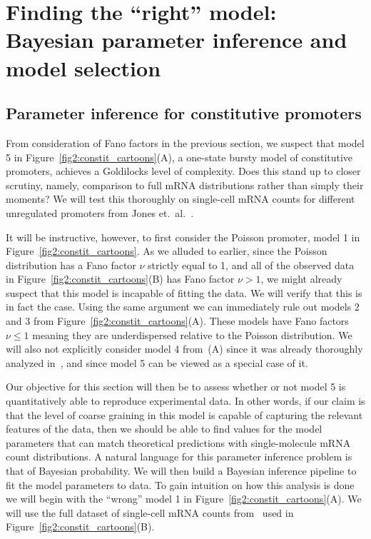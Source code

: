 \section{Finding the ``right'' model: Bayesian parameter inference and model 
selection}
\label{section_04_bayesian_inference}
\subsection{Parameter inference for constitutive promoters}

From consideration of Fano factors in the previous section, we suspect that
model 5 in Figure~\ref{fig2:constit_cartoons}(A), a one-state bursty model of
constitutive promoters, achieves a Goldilocks level of complexity. Does this
stand up to closer scrutiny, namely, comparison to full mRNA distributions
rather than simply their moments? We will test this thoroughly on
single-cell mRNA counts for different unregulated promoters from Jones et.\
al.~\cite{Jones2014}.

It will be instructive, however, to first consider the Poisson promoter, model 1
in Figure~\ref{fig2:constit_cartoons}. As we alluded to earlier, since the
Poisson distribution has a Fano factor $\nu$ strictly equal to 1, and all of
the observed data in Figure~\ref{fig2:constit_cartoons}(B) has Fano factor
$\nu>1$, we might already suspect that this model is incapable of fitting the
data. We will verify that this is in fact the case. Using the same argument we
can immediately rule out models 2 and 3 from
Figure~\ref{fig2:constit_cartoons}(A). These models have Fano factors $\nu\le 1$
meaning they are underdispersed relative to the Poisson distribution. We will
also not explicitly consider model 4 from~\fig{fig2:constit_cartoons}(A) since
it was already thoroughly analyzed in~\cite{Razo-Mejia2020}, and since model 5
can be viewed as a special case of it.

Our objective for this section will then be to assess whether or not model 5 is
quantitatively able to reproduce experimental data. In other words, if our claim
is that the level of coarse graining in this model is capable of capturing the
relevant features of the data, then we should be able to find values for the
model parameters that can match theoretical predictions with single-molecule
mRNA count distributions. A natural language for this parameter inference
problem is that of Bayesian probability. We will then build a Bayesian inference
pipeline to fit the model parameters to data. To gain intuition on how this
analysis is done we will begin with the ``wrong'' model 1 in
Figure~\ref{fig2:constit_cartoons}(A). We will use the full dataset of
single-cell mRNA counts from~\cite{Jones2014} used in
Figure~\ref{fig2:constit_cartoons}(B).


